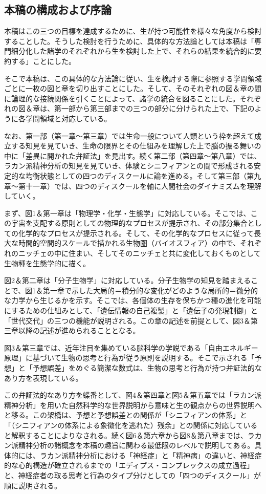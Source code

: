 \subsection{本稿の構成および序論}\label{ux672cux7a3fux306eux69cbux6210ux304aux3088ux3073ux5e8fux8ad6}

本稿はこの三つの目標を達成するために、生が持つ可能性を様々な角度から検討することした。そうした検討を行うために、具体的な方法論としては本稿は「専門細分化した諸学のそれぞれから生を検討した上で、それらの結果を統合的に要約する」ことにした。

そこで本稿は、この具体的な方法論に従い、生を検討する際に参照する学問領域ごとに一枚の図と章を切り出すことにした。そして、そのそれぞれの図＆章の間に論理的な接続関係を引くことによって、諸学の統合を図ることにした。それぞれの図＆章は、第一部から第三部までの三つの部分に分けられた上で、下記のように各学問領域と対応している。

なお、第一部（第一章～第三章）では生命一般について人類という枠を超えて成立する知見を見ていき、生命の限界とその仕組みを理解した上で脳の振る舞いの中に「差異に開かれた弁証法」を見出す。続く第二部（第四章～第八章）では、ラカン派精神分析の知見を見ていき、体験とシニフィアンとの間で形成される安定的な均衡状態としての四つのディスクールに論を進める。そして第三部（第九章～第十一章）では、四つのディスクールを軸に人間社会のダイナミズムを理解していく。

まず、図1＆第一章は「物理学・化学・生態学」に対応している。そこでは、この宇宙を支配する原則としての物理的なプロセスが提示され、その部分集合としての化学的なプロセスが提示される。そして、その化学的なプロセスに従って長大な時間的空間的スケールで描かれる生物圏（バイオスフィア）の中で、それぞれのニッチェの中に住まい、そしてそのニッチェと共に変化しておくものとして生物種を生態学的に描く。

図2＆第二章は「分子生物学」に対応している。分子生物学の知見を踏まえることで、図1＆第一章で示した大局的＝積分的な変化がどのような局所的＝微分的な力学から生じるかを示す。そこでは、各個体の生存を保ちかつ種の進化を可能にするための仕組みとして、「遺伝情報の自己複製」と「遺伝子の発現制御」と「世代交代」の三つの機能が説明される。この章の記述を前提として、図3＆第三章以降の記述が進められることとなる。

図3＆第三章では、近年注目を集めている脳科学の学説である「自由エネルギー原理」に基づいて生物の思考と行為が従う原則を説明する。そこで示される「予想」と「予想誤差」をめぐる簡潔な数式は、生物の思考と行為が持つ弁証法的なあり方を表現している。

この弁証法的なあり方を蝶番として、図4＆第四章と図5＆第五章では「ラカン派精神分析」を用いた自然科学的な世界説明から意味と生の観点からの世界説明へと移る。この架橋は、予想と予想誤差との関係が「シニフィアンの体系」と「（シニフィアンの体系による象徴化を逃れた）残余」との関係に対応していると解釈することによりなされる。続く図6＆第六章から図8＆第八章までは、ラカン派精神分析の諸概念を本稿の趣旨に関わる最低限のレベルで説明してある。具体的には、ラカン派精神分析における「神経症」と「精神病」の違いと、神経症的な心的構造が確立されるまでの「エディプス・コンプレックスの成立過程」と、神経症者の取る思考と行為のタイプ分けとしての「四つのディスクール」が順に説明される。

